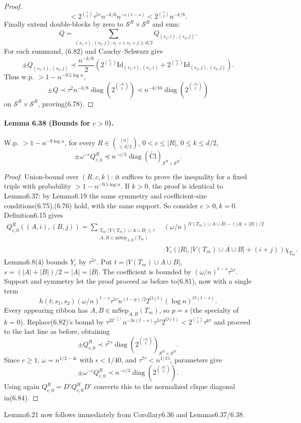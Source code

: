 \documentclass[10pt,a4paper]{article}
\begin{document}
\begin{proof}
\[<2^{\binom s2}\tau^{5\tau}n^{-k/6}n^{-\epsilon(t-s)}<2^{\binom s2}n^{-k/8}.\tag{6.82}\]
Finally extend double-blocks by zero to $\mathcal S^R\times\mathcal S^R$ and sum:
\[Q=\sum_{(s_1,i),(s_2,j):s_1+i,s_2+j\ge d/2}Q_{(s_1,i),(s_2,j)}.\tag{6.83}\]
For each summand, (6.82) and Cauchy--Schwarz give
\[\pm Q_{(s_1,i),(s_2,j)}\prec\frac{n^{-k/8}}2\left(2^{\binom{s_1}2}\mathrm{Id}_{(s_1,i),(s_1,i)}+2^{\binom{s_2}2}\mathrm{Id}_{(s_2,j),(s_2,j)}\right).\]
Thus w.p. $>1-n^{-9.5\log n}$,
\[\pm Q\prec\tau^2n^{-k/8}\operatorname{diag}(2^{\binom{|A|}2})\prec n^{-k/10}\operatorname{diag}(2^{\binom{|A|}2})\]
on $\mathcal S^R\times\mathcal S^R$, proving(6.78).\end{proof}
\paragraph{Lemma 6.38 (Bounds for $c>0$).} W.p. $>1-n^{-9\log n}$, for every $R\in\binom{[n]}{\le d/2}$, $0<c\le|R|$, $0\le k\le d/2$,
\[\pm\omega^{-c}Q_{c,k}^R\preceq n^{-c/3}\operatorname{diag}(\widetilde{\mathrm{Cl}})_{\mathcal S^R\times\mathcal S^R}.\tag{6.84}\]
\begin{proof}Union-bound over $(R,c,k)$: it suffices to prove the inequality for a fixed triple with probability $>1-n^{-9.5\log n}$. If $k>0$, the proof is identical to Lemma6.37: by Lemma6.19 the same symmetry and coefficient-size conditions(6.75),(6.76) hold, with the same support. So consider $c>0,k=0$. Definition6.15 gives
\begin{align*}Q_{c,0}^R((A,i),(B,j))=\sum_{\substack{T_m:|V(T_m)\cup A\cup B|\le\tau\\A,B\in\mathrm{mSep}_{A,B}(T_m)}}&(\omega/n)^{|V(T_m)\cup A\cup B|-(|A|+|B|)/2}\\&\cdot Y_c(|R|,|V(T_m)\cup A\cup B|+(i+j))\chi_{T_m}.\tag{6.85}\end{align*}
Lemma6.8(4) bounds $Y_c$ by $\tau^{5\tau}$. Put $t=|V(T_m)\cup A\cup B|$, $s=(|A|+|B|)/2=|A|=|B|$. The coefficient is bounded by $(\omega/n)^{t-s}\tau^{5\tau}$. Support and symmetry let the proof proceed as before to(6.81), now with a single term
\[h(t;s_1,s_2)(\omega/n)^{t-s}\tau^{5\tau}n^{(t-p)/2}2^{O(t)}(\log n)^{O(t-s)}.\]
Every appearing ribbon has $A,B\in\mathrm{mSep}_{A,B}(T_m)$, so $p=s$ (the specialty of $k=0$). Replace(6.82)'s bound by $\tau^32^{\binom s2}n^{-3\epsilon(t-s)}\tau^{5\tau}2^{O(t)}<2^{\binom s2}\tau^{6\tau}$ and proceed to the last line as before, obtaining
\[\pm Q_{c,0}^R\prec\tau^{7\tau}\operatorname{diag}(2^{\binom{|A|}2})_{\mathcal S^R\times\mathcal S^R}.\]
Since $c\ge1$, $\omega=n^{1/2-4\epsilon}$ with $\epsilon<1/40$, and $\tau^{7\tau}<n^{1/15}$, parameters give
\[\pm\omega^{-c}Q_{c,0}^R\prec n^{-c/3}\operatorname{diag}(2^{\binom{|A|}2}).\]
Using again $Q_{c,0}^R=D'Q_{c,0}^RD'$ converts this to the normalized clique diagonal in(6.84).\end{proof}
Lemma6.21 now follows immediately from Corollary6.36 and Lemmas6.37/6.38.
\end{document}
